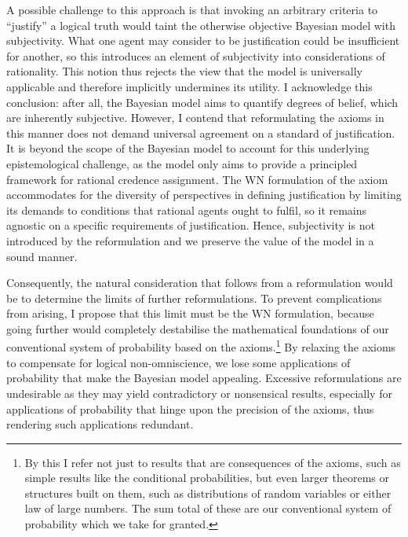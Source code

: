 \documentclass[12pt]{article}
\begin{document}
A possible challenge to this approach is that invoking an arbitrary criteria to ``justify'' a logical truth would taint the otherwise objective Bayesian model with subjectivity. What one agent may consider to be justification could be insufficient for another, so this introduces an element of subjectivity into considerations of rationality. This notion thus rejects the view that the model is universally applicable and therefore implicitly undermines its utility. I acknowledge this conclusion: after all, the Bayesian model aims to quantify degrees of belief, which are inherently subjective. However, I contend that reformulating the axioms in this manner does not demand universal agreement on a standard of justification. It is beyond the scope of the Bayesian model to account for this underlying epistemological challenge, as the model only aims to provide a principled framework for rational credence assignment. The WN formulation of the axiom accommodates for the diversity of perspectives in defining justification by limiting its demands to conditions that rational agents ought to fulfil, so it remains agnostic on a specific requirements of justification. Hence, subjectivity is not introduced by the reformulation and we preserve the value of the model in a sound manner.

Consequently, the natural consideration that follows from a reformulation would be to determine the limits of further reformulations. To prevent complications from arising, I propose that this limit must be the WN formulation, because going further would completely destabilise the mathematical foundations of our conventional system of probability based on the axioms.\footnote{By this I refer not just to results that are consequences of the axioms, such as simple results like the conditional probabilities, but even larger theorems or structures built on them, such as distributions of random variables or either law of large numbers. The sum total of these are our conventional system of probability which we take for granted.}  By relaxing the axioms to compensate for logical non-omniscience, we lose some applications of probability that make the Bayesian model appealing.\autocite[436]{oup} Excessive reformulations are undesirable as they may yield contradictory or nonsensical results, especially for applications of probability that hinge upon the precision of the axioms, thus rendering such applications redundant.
\end{document}
